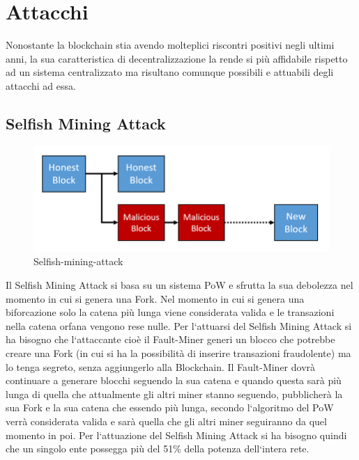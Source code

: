\documentclass[11pt,a4paper,titlepage]{report}
\begin{document}
\section{Attacchi}
Nonostante la blockchain stia avendo molteplici riscontri positivi negli ultimi anni, la sua caratteristica di decentralizzazione la rende si più affidabile rispetto ad un sistema centralizzato ma risultano comunque possibili e attuabili degli attacchi ad essa.

\subsection{Selfish Mining Attack}
\begin{figure}[h]
	\includegraphics[width=\textwidth]{Selfish-mining-attack}
	\centering
	\caption{Selfish-mining-attack}
	\label{fig:SM-attack}
\end{figure}
Il Selfish Mining Attack si basa su un sistema PoW e sfrutta la sua debolezza nel momento in cui si genera una Fork. Nel momento in cui si genera una biforcazione solo la catena più lunga viene considerata valida e le transazioni nella catena orfana vengono rese nulle. Per l`attuarsi del Selfish Mining Attack si ha bisogno che l`attaccante cioè il Fault-Miner generi un blocco che potrebbe creare una Fork (in cui si ha la possibilità di inserire transazioni fraudolente) ma lo tenga segreto, senza aggiungerlo alla Blockchain. Il Fault-Miner dovrà continuare a generare blocchi seguendo la sua catena e quando questa sarà più lunga di quella che attualmente gli altri miner stanno seguendo, pubblicherà la sua Fork e la sua catena che essendo più lunga, secondo l`algoritmo del PoW verrà considerata valida e sarà quella che gli altri miner seguiranno da quel momento in poi. Per l`attuazione del Selfish Mining Attack si ha bisogno quindi che un singolo ente possegga più del 51\% della potenza dell`intera rete.
\end{document}

